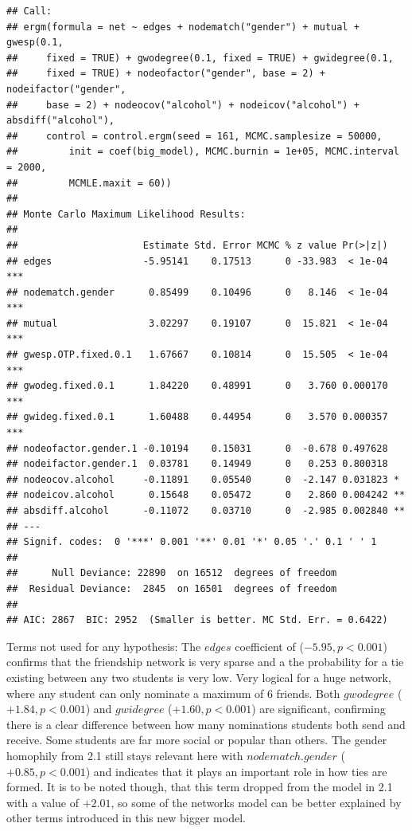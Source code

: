 \documentclass[
]{article}
\begin{document}
\begin{verbatim}
## Call:
## ergm(formula = net ~ edges + nodematch("gender") + mutual + gwesp(0.1, 
##     fixed = TRUE) + gwodegree(0.1, fixed = TRUE) + gwidegree(0.1, 
##     fixed = TRUE) + nodeofactor("gender", base = 2) + nodeifactor("gender", 
##     base = 2) + nodeocov("alcohol") + nodeicov("alcohol") + absdiff("alcohol"), 
##     control = control.ergm(seed = 161, MCMC.samplesize = 50000, 
##         init = coef(big_model), MCMC.burnin = 1e+05, MCMC.interval = 2000, 
##         MCMLE.maxit = 60))
## 
## Monte Carlo Maximum Likelihood Results:
## 
##                      Estimate Std. Error MCMC % z value Pr(>|z|)    
## edges                -5.95141    0.17513      0 -33.983  < 1e-04 ***
## nodematch.gender      0.85499    0.10496      0   8.146  < 1e-04 ***
## mutual                3.02297    0.19107      0  15.821  < 1e-04 ***
## gwesp.OTP.fixed.0.1   1.67667    0.10814      0  15.505  < 1e-04 ***
## gwodeg.fixed.0.1      1.84220    0.48991      0   3.760 0.000170 ***
## gwideg.fixed.0.1      1.60488    0.44954      0   3.570 0.000357 ***
## nodeofactor.gender.1 -0.10194    0.15031      0  -0.678 0.497628    
## nodeifactor.gender.1  0.03781    0.14949      0   0.253 0.800318    
## nodeocov.alcohol     -0.11891    0.05540      0  -2.147 0.031823 *  
## nodeicov.alcohol      0.15648    0.05472      0   2.860 0.004242 ** 
## absdiff.alcohol      -0.11072    0.03710      0  -2.985 0.002840 ** 
## ---
## Signif. codes:  0 '***' 0.001 '**' 0.01 '*' 0.05 '.' 0.1 ' ' 1
## 
##      Null Deviance: 22890  on 16512  degrees of freedom
##  Residual Deviance:  2845  on 16501  degrees of freedom
##  
## AIC: 2867  BIC: 2952  (Smaller is better. MC Std. Err. = 0.6422)
\end{verbatim}

Terms not used for any hypothesis: The \(edges\) coefficient of
(\(-5.95, p<0.001\)) confirms that the friendship network is very sparse
and a the probability for a tie existing between any two students is
very low. Very logical for a huge network, where any student can only
nominate a maximum of \(6\) friends. Both \(gwodegree\)
(\(+1.84, p<0.001\)) and \(gwidegree\) (\(+1.60, p<0.001\)) are
significant, confirming there is a clear difference between how many
nominations students both send and receive. Some students are far more
social or popular than others. The gender homophily from 2.1 still stays
relevant here with \(nodematch.gender\) (\(+0.85, p<0.001\)) and
indicates that it plays an important role in how ties are formed. It is
to be noted though, that this term dropped from the model in 2.1 with a
value of \(+2.01\), so some of the networks model can be better
explained by other terms introduced in this new bigger model.
\end{document}
